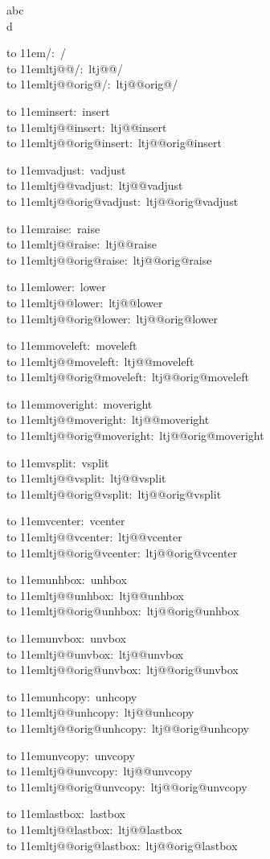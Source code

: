 \documentclass[landscape]{article}
\begin{document}
\ttfamily\parindent0pt\footnotesize
\def\chk#1{%
  \par\medskip\leavevmode
  \hbox to 11em{\expandafter\string\csname #1\endcsname:\hss}\ 
    \expandafter\meaning\csname #1\endcsname\\
  \hbox to 11em{\expandafter\string\csname ltj@@#1\endcsname:\hss}\ 
    \expandafter\meaning\csname ltj@@#1\endcsname\\
  \hbox to 11em{\expandafter\string\csname ltj@@orig@#1\endcsname:\hss}\ 
    \expandafter\meaning\csname ltj@@orig@#1\endcsname
}

abc\\d

\chk{/}
\chk{insert}
\chk{vadjust}
\chk{raise}
\chk{lower}
\chk{moveleft}
\chk{moveright}
\chk{vsplit}
\chk{vcenter}
\chk{unhbox}
\chk{unvbox}
\chk{unhcopy}
\chk{unvcopy}
\chk{lastbox}
\end{document}
